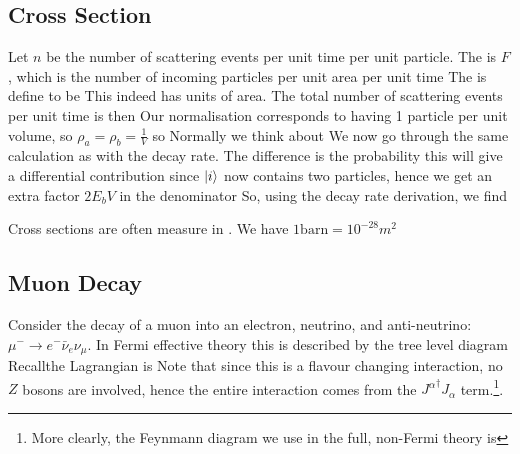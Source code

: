 \documentclass{article}
\begin{document}
\subsection{Cross Section}
Let $n$ be the number of scattering events per unit time per unit particle. The  is $F$, which is the number of incoming particles per unit area per unit time 
The  is define to be 
This indeed has units of area. The total number of scattering events per unit time is then 
Our normalisation corresponds to having 1 particle per unit volume, so $\rho_a = \rho_b = \frac{1}{V}$ so 
Normally we think about  
We now go through the same calculation as with the decay rate. The difference is the probability 
this will give a differential contribution since $\ket{i}$ now contains two particles, hence we get an extra factor $2E_b V$ in the denominator 
So, using the decay rate derivation, we find 

\begin{remark}
Cross sections are often measure in . We have $1 \text{barn} = 10^{-28} m^{2}$
\end{remark}

\subsection{Muon Decay}

Consider the decay of a muon into an electron, neutrino, and anti-neutrino: $\mu^- \to e^- \bar{\nu}_e \nu_\mu$. In Fermi effective theory this is described by the tree level diagram 
Recallthe Lagrangian is 
Note that since this is a flavour changing interaction, no $Z$ bosons are involved, hence the entire interaction comes from the ${J^\alpha}^\dagger J_\alpha$ term.\footnote{More clearly, the Feynmann diagram we use in the full, non-Fermi theory is }.
\end{document}
